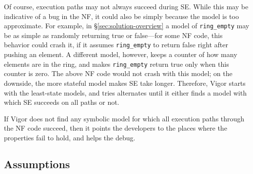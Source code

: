 \documentclass[letterpaper,twocolumn,10pt]{article}
\newcommand{\code}[1]{\lstinline{#1}}
\begin{document}
Of course, execution paths may not always succeed during SE. While this may be indicative of a bug in the NF, it could also be simply because the model is too approximate. For example, in \S\ref{sec:solution-overview} a model of \code{ring_empty} may be as simple as randomly returning true or false---for some NF code, this behavior could crash it, if it assumes \code{ring_empty} to return false right after pushing an element. A different model, however, keeps a counter of how many elements are in the ring, and makes \code{ring_empty} return true only when this counter is zero. The above NF code would not crash with this model; on the downside, the more stateful model makes SE take longer. Therefore, Vigor starts with the least-state models, and tries alternates until it either finds a model with which SE succeeds on all paths or not.

If Vigor does not find any symbolic model for which all execution paths through the NF code succeed, then it points the developers to the places where the properties fail to hold, and helps the debug.




%     

\subsection{Assumptions}
\label{sec:assumptions}
\end{document}
